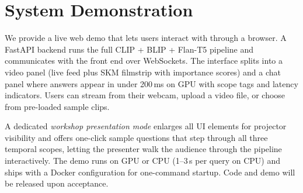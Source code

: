 \section*{System Demonstration}
\label{sec:demo}

We provide a live web demo that lets users interact with \ours through a browser.
A FastAPI backend runs the full CLIP + BLIP + Flan-T5 pipeline and communicates with the front end over WebSockets.
The interface splits into a video panel (live feed plus SKM filmstrip with importance scores) and a chat panel where answers appear in under 200\,ms on GPU with scope tags and latency indicators.
Users can stream from their webcam, upload a video file, or choose from pre-loaded sample clips.

A dedicated \emph{workshop presentation mode} enlarges all UI elements for projector visibility and offers one-click sample questions that step through all three temporal scopes, letting the presenter walk the audience through the pipeline interactively.
The demo runs on GPU or CPU (1--3\,s per query on CPU) and ships with a Docker configuration for one-command startup.
Code and demo will be released upon acceptance.
